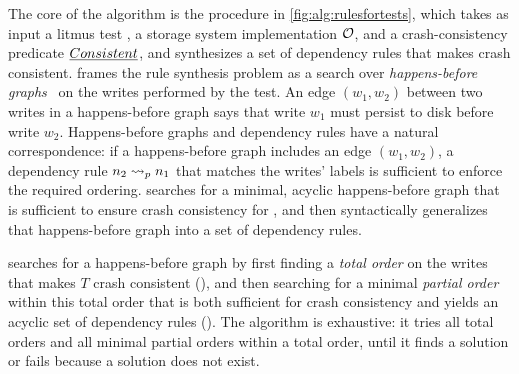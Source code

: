 The core of the \depsynthalg algorithm is the
 procedure in \cref{fig:alg:rulesfortests},
which takes as input a litmus test \test,
a storage system implementation $\sys$,
and a crash-consistency predicate $\emph{Consistent}$,
and synthesizes a set of dependency rules
that makes \test crash consistent.
 frames the rule synthesis problem
as a search over \emph{happens-before graphs}~\cite{lamport:happens-before}
on the writes performed by the test.
An edge $(w_1, w_2)$ between two writes in a happens-before graph
says that write $w_1$ must persist to disk before write $w_2$.
Happens-before graphs and dependency rules have a natural correspondence:
if a happens-before graph includes an edge $(w_1, w_2)$,
a dependency rule $\deprule{n_2}{n_1}{p}$ that matches the writes' labels
is sufficient to enforce the required ordering.
 searches for a minimal, acyclic happens-before graph
that is sufficient to ensure crash consistency for \test,
and then syntactically generalizes that happens-before graph into a set of dependency rules.

 searches for a happens-before graph by first finding a \emph{total
order} on the writes that makes $T$ crash consistent (\phaseone), and then
searching for a minimal \emph{partial order} within this total order that is
both sufficient for crash consistency and yields an acyclic set of dependency
rules (\phasetwo). The algorithm is exhaustive: it tries all total orders and
all minimal partial orders within a total order, until it finds a solution or
fails because a solution does not exist.

